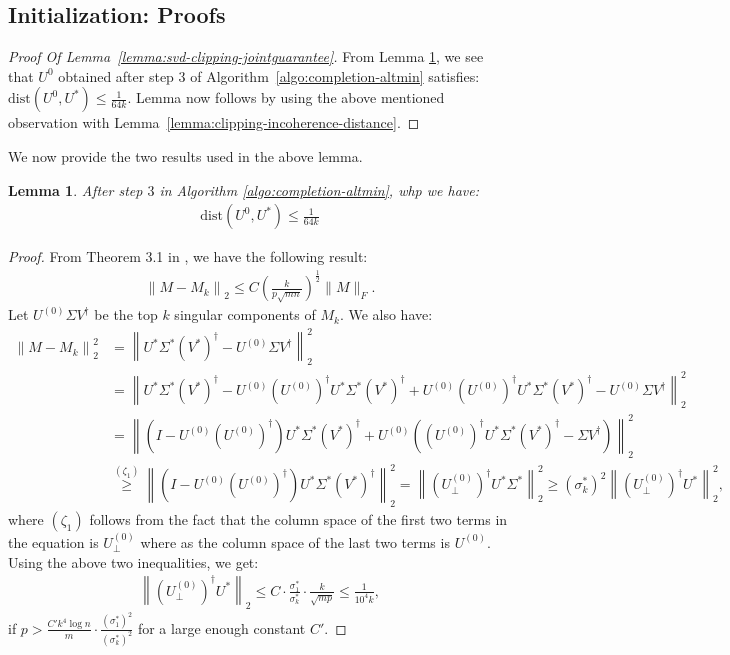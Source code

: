 \documentclass[11pt]{article}
\theoremstyle{plain}
\newtheorem{lemma}[theorem]{Lemma}
\theoremstyle{definition}
\newcommand{\dist}{\mathrm{dist}}
\newcommand{\twonorm}[1]{\left\| {#1} \right\|_2}
\newcommand{\so}{\sigma^*}
\begin{document}
\subsection{Initialization: Proofs}\label{app:comp_init}
\begin{proof}[Proof Of Lemma~\ref{lemma:svd-clipping-jointguarantee}]
  From Lemma \ref{lemma:first-step-svd}, we see that $U^0$ obtained after step $3$ of Algorithm~\ref{algo:completion-altmin} satisfies: $\dist\left(U^{0},U^*\right)\leq \frac{1}{64 k}$. Lemma now follows by using the above mentioned observation with Lemma~\ref{lemma:clipping-incoherence-distance}.\end{proof}
We now provide the two results used in the above lemma. %
\begin{lemma}\label{lemma:first-step-svd}
After step $3$ in Algorithm \ref{algo:completion-altmin}, whp we have:
  \begin{align*}
    \dist\left(U^{0},U^*\right) \leq \frac{1}{64 k}
  \end{align*}
\end{lemma}
\begin{proof}
  From Theorem 3.1 in \cite{KeshavanOM2009}, we have the following result:
  \begin{align*}
    \twonorm{M - M_k} \leq C \left(\frac{k}{p\sqrt{mn}}\right)^{\frac{1}{2}}\|M\|_F.
  \end{align*}
Let $U^{(0)}\Sigma V^{\dag}$ be the top $k$ singular components of $M_k$.
We also have:
\begin{align*}
  \twonorm{M - M_k}^2 &= \twonorm{U^* \Sigma^* (V^*)^{\dag} - U^{(0)}\Sigma V^{\dag}}^2\\
	&= \left\|U^* \Sigma^* (V^*)^{\dag} - U^{(0)}\left(U^{(0)}\right)^{\dag}U^* \Sigma^* (V^*)^{\dag}
	  + U^{(0)}\left(U^{(0)}\right)^{\dag}U^* \Sigma^* (V^*)^{\dag} - U^{(0)}\Sigma V^{\dag}\right\|_2^2 \\
	&= \left\|\left(I-U^{(0)}\left(U^{(0)}\right)^{\dag}\right)U^* \Sigma^* (V^*)^{\dag}
	  + U^{(0)} \left(\left(U^{(0)}\right)^{\dag}U^* \Sigma^* (V^*)^{\dag} - \Sigma V^{\dag}\right)\right\|_2^2 \\
	&\stackrel{(\zeta_1)}{\geq} \twonorm{\left(I-U^{(0)}\left(U^{(0)}\right)^{\dag}\right)U^* \Sigma^* (V^*)^{\dag} }^2 = \twonorm{\left(U_{\perp}^{(0)}\right)^{\dag}U^* \Sigma^*}^2 \geq \left(\sigma_k^*\right)^2 \twonorm{\left(U_{\perp}^{(0)}\right)^{\dag}U^*}^2,
\end{align*}
where $(\zeta_1)$ follows from the fact that the column space of the first two terms in the equation is $U_{\perp}^{(0)}$ where as the column space
of the last two terms is $U^{(0)}$. Using the above two inequalities, we get:
\begin{align*}
  \twonorm{\left(U_{\perp}^{(0)}\right)^{\dag}U^*} \leq C\cdot\frac{\so_1}{\sigma_k^*} \cdot \frac{k}{\sqrt{mp}}
	\leq \frac{1}{10^4 k},
\end{align*}
if $p > \frac{C'k^4\log n}{m}\cdot \frac{(\so_1)^2}{(\so_k)^2}$ for a large enough constant $C'$.
\end{proof}
\end{document}
